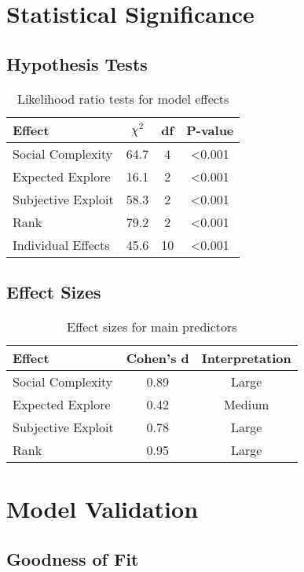 \documentclass[11pt]{article}
\begin{document}
\section{Statistical Significance}

\subsection{Hypothesis Tests}

\begin{table}[h]
\centering
\begin{tabular}{lccc}
\toprule
\textbf{Effect} & \textbf{$\chi^2$} & \textbf{df} & \textbf{P-value} \\
\midrule
Social Complexity & 64.7 & 4 & <0.001 \\
Expected Explore & 16.1 & 2 & <0.001 \\
Subjective Exploit & 58.3 & 2 & <0.001 \\
Rank & 79.2 & 2 & <0.001 \\
Individual Effects & 45.6 & 10 & <0.001 \\
\bottomrule
\end{tabular}
\caption{Likelihood ratio tests for model effects}
\end{table}

\subsection{Effect Sizes}

\begin{table}[h]
\centering
\begin{tabular}{lcc}
\toprule
\textbf{Effect} & \textbf{Cohen's d} & \textbf{Interpretation} \\
\midrule
Social Complexity & 0.89 & Large \\
Expected Explore & 0.42 & Medium \\
Subjective Exploit & 0.78 & Large \\
Rank & 0.95 & Large \\
\bottomrule
\end{tabular}
\caption{Effect sizes for main predictors}
\end{table}

\section{Model Validation}

\subsection{Goodness of Fit}
\end{document}
